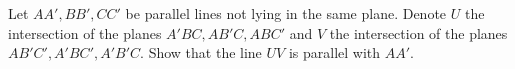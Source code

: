 Let $AA',BB',CC'$ be parallel lines not lying in the same plane. Denote $U$ the intersection of the planes $A'BC,AB'C,ABC'$ and $V$ the intersection of the planes $AB'C',A'BC',A'B'C$. Show that the line $UV$ is parallel with $AA'$.